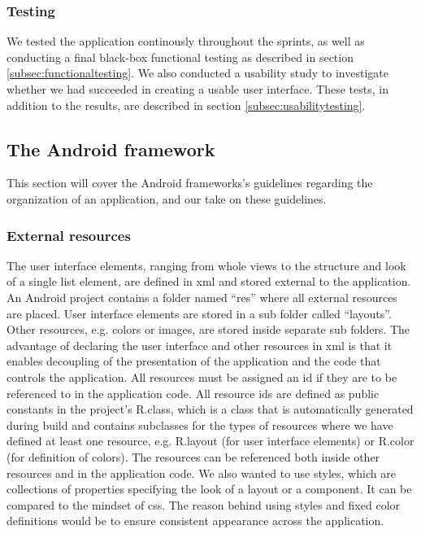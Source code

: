 \subsubsection{Testing}
We tested the application continously throughout the sprints, as well as conducting a final black-box functional testing as described in section \ref{subsec:functionaltesting}. We also conducted a usability study to investigate whether we had succeeded in creating a usable user interface. These tests, in addition to the results, are described in section \ref{subsec:usabilitytesting}.

\subsection{The Android framework}\label{subsec:androidframework}
This section will cover the Android frameworks's guidelines regarding the organization of an application, and our take on these guidelines. 

\subsubsection{External resources}
The user interface elements, ranging from whole views to the structure and look of a single list element, are defined in \gls{xml} and stored external to the application. An Android project contains a folder named “res” where all external resources are placed. User interface elements are stored in a sub folder called “layouts”. Other resources, e.g. colors or images, are stored inside separate sub folders. The advantage of declaring the user interface and other resources in \gls{xml} is that it enables decoupling of the presentation of the application and the code that controls the application.
\newline
\newline
All resources must be assigned an \gls{id} if they are to be referenced to in the application code. All resource \gls{id}s are defined as public constants in the project's R.class, which is a class that is automatically generated during build and contains subclasses for the types of resources where we have defined at least one resource, e.g. R.layout (for user interface elements) or R.color (for definition of colors). The resources can be referenced both inside other resources and in the application code.
\newline
\newline
We also wanted to use styles, which are collections of properties specifying the look of a layout or a component. It can be compared to the mindset of \gls{css}. The reason behind using styles and fixed color definitions would be to ensure consistent appearance across the application. 

